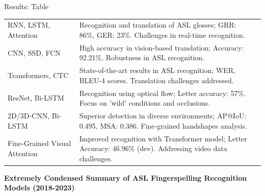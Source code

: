 \documentclass{beamer} %
\begin{document}
\begin{frame}[t]
\begin{columns}[t]
\begin{column}{0.3\textwidth}
\begin{block}{Results: Table}
\begin{footnotesize}
\begin{tabular}{p{} p{} p{}}
						RNN, LSTM, Attention          & Recognition and translation of ASL glosses; GRR: 86\%, GER: 23\%. Challenges in real-time recognition.         & \cite{skumarTimeSeriesNeural2018}                  \\
						CNN, SSD, FCN                 & High accuracy in vision-based translation; Accuracy: 92.21\%. Robustness in ASL recognition.                   & \cite{abiyevReconstructionConvolutionalNeural2020} \\
						Transformers, CTC             & State-of-the-art results in ASL recognition; WER, BLEU-4 scores. Translation challenges addressed.             & \cite{cihancamgozSignLanguageTransformers2020}     \\
						ResNet, Bi-LSTM               & Recognition using optical flow; Letter accuracy: 57\%. Focus on 'wild' conditions and occlusions.              & \cite{kabadeAmericanSignLanguage2023}              \\
						2D/3D-CNN, Bi-LSTM            & Superior detection in diverse environments; AP@IoU: 0.495, MSA: 0.386. Fine-grained handshapes analysis.       & \cite{shiFingerspellingDetectionAmerican2021}      \\
						Fine-Grained Visual Attention & Improved recognition with Transformer model; Letter Accuracy: 46.96\% (dev). Addressing video data challenges. & \cite{gajurelFineGrainedVisualAttention2021}       \\

						\bottomrule
					\end{tabular}
					\centering\textbf{Extremely Condensed Summary of ASL Fingerspelling Recognition Models (2018-2023)}

				\end{footnotesize}
			\end{block}



\end{column}
\end{columns}
\end{frame}
\end{document}
